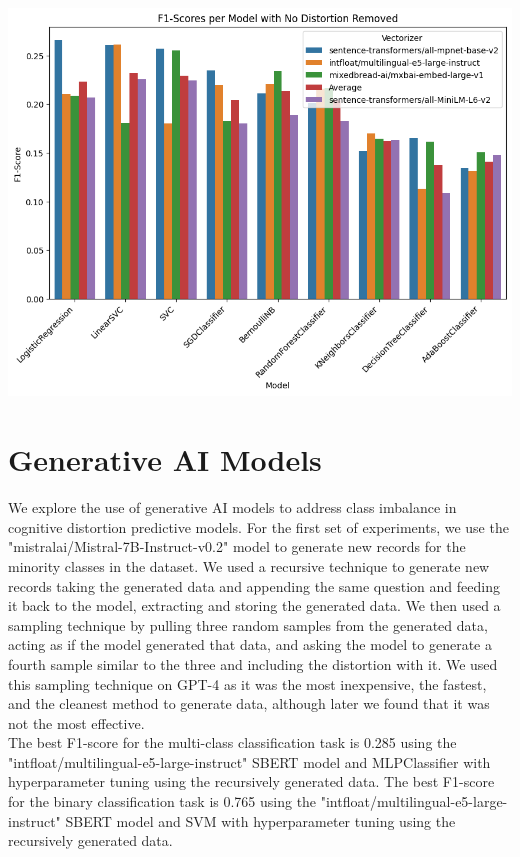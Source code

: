 \documentclass[a0,landscape]{a0poster}
\begin{document}
\begin{multicols}{4}
\begin{center}\vspace{1cm}
\includegraphics[width=0.70\linewidth]{figures/F1ScoresInitSBERT.png}
\end{center}\vspace{1cm}

\color{Black}

\color{Teal}
\section*{Generative AI Models}
\color{Black}

We explore the use of generative AI models to address class imbalance in cognitive distortion predictive models. 
For the first set of experiments, we use the "mistralai/Mistral-7B-Instruct-v0.2" model to generate new records for the minority classes in the dataset.
We used a recursive technique to generate new records taking the generated data and appending the same question and feeding it back to the model, extracting and storing the generated data.
We then used a sampling technique by pulling three random samples from the generated data, acting as if the model generated that data, and asking the model to generate a fourth sample similar to the three and including the distortion with it.
We used this sampling technique on GPT-4 as it was the most inexpensive, the fastest, and the cleanest method to generate data, although later we found that it was not the most effective.
\\
The best F1-score for the multi-class classification task is 0.285 using the "intfloat/multilingual-e5-large-instruct" SBERT model and MLPClassifier with hyperparameter tuning using the recursively generated data. 
The best F1-score for the binary classification task is 0.765 using the "intfloat/multilingual-e5-large-instruct" SBERT model and SVM with hyperparameter tuning using the recursively generated data. 


\end{multicols}
\end{document}
